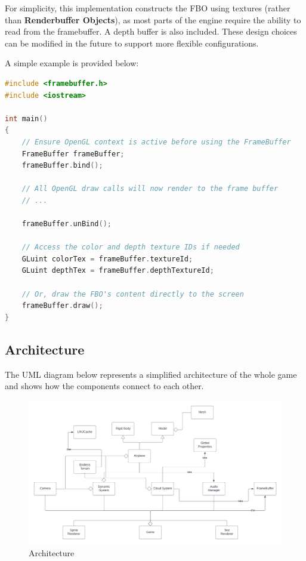 For simplicity, this implementation constructs the FBO using textures (rather than \textbf{Renderbuffer Objects}), as most parts of the engine require the ability to read from the framebuffer. A depth buffer is also included. These design choices can be modified in the future to support more flexible configurations.

A simple example is provided below:

\begin{lstlisting}[language={C++}]
#include <framebuffer.h>
#include <iostream>

int main() 
{
    // Ensure OpenGL context is active before using the FrameBuffer
    FrameBuffer frameBuffer;
    frameBuffer.bind();

    // All OpenGL draw calls will now render to the frame buffer
    // ...

    frameBuffer.unBind();

    // Access the color and depth texture IDs if needed
    GLuint colorTex = frameBuffer.textureId;
    GLuint depthTex = frameBuffer.depthTextureId;

    // Or, draw the FBO's content directly to the screen
    frameBuffer.draw(); 
}
\end{lstlisting}


\subsection{Architecture}

The UML diagram below represents a simplified architecture of the whole game and shows how the components connect to each other.

\begin{figure}[H]
    \centering
    \includegraphics[width=1.0\textwidth]{images/architecture.png}
    \caption{Architecture}
    \label{fig:architecture}
\end{figure}


